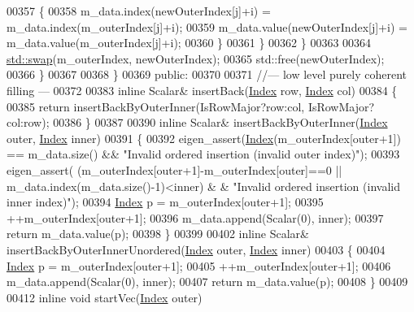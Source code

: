 \begin{DoxyCode}
00357             \{
00358               m\_data.index(newOuterIndex[j]+i) = m\_data.index(m\_outerIndex[j]+i);
00359               m\_data.value(newOuterIndex[j]+i) = m\_data.value(m\_outerIndex[j]+i);
00360             \}
00361           \}
00362         \}
00363         
00364         \hyperlink{endian_8c_a3ca5ecd34b04d6a243c054ac3a57f68d}{std::swap}(m\_outerIndex, newOuterIndex);
00365         std::free(newOuterIndex);
00366       \}
00367       
00368     \}
00369   \textcolor{keyword}{public}:
00370 
00371     \textcolor{comment}{//--- low level purely coherent filling ---}
00372 
00383     \textcolor{keyword}{inline} Scalar& insertBack(\hyperlink{group___core___module_a554f30542cc2316add4b1ea0a492ff02}{Index} row, \hyperlink{group___core___module_a554f30542cc2316add4b1ea0a492ff02}{Index} col)
00384     \{
00385       \textcolor{keywordflow}{return} insertBackByOuterInner(IsRowMajor?row:col, IsRowMajor?col:row);
00386     \}
00387 
00390     \textcolor{keyword}{inline} Scalar& insertBackByOuterInner(\hyperlink{group___core___module_a554f30542cc2316add4b1ea0a492ff02}{Index} outer, \hyperlink{group___core___module_a554f30542cc2316add4b1ea0a492ff02}{Index} inner)
00391     \{
00392       eigen\_assert(\hyperlink{namespace_eigen_a62e77e0933482dafde8fe197d9a2cfde}{Index}(m\_outerIndex[outer+1]) == m\_data.size() && \textcolor{stringliteral}{"Invalid ordered insertion
       (invalid outer index)"});
00393       eigen\_assert( (m\_outerIndex[outer+1]-m\_outerIndex[outer]==0 || m\_data.index(m\_data.size()-1)<inner) &
      & \textcolor{stringliteral}{"Invalid ordered insertion (invalid inner index)"});
00394       \hyperlink{group___core___module_a554f30542cc2316add4b1ea0a492ff02}{Index} p = m\_outerIndex[outer+1];
00395       ++m\_outerIndex[outer+1];
00396       m\_data.append(Scalar(0), inner);
00397       \textcolor{keywordflow}{return} m\_data.value(p);
00398     \}
00399 
00402     \textcolor{keyword}{inline} Scalar& insertBackByOuterInnerUnordered(\hyperlink{group___core___module_a554f30542cc2316add4b1ea0a492ff02}{Index} outer, \hyperlink{group___core___module_a554f30542cc2316add4b1ea0a492ff02}{Index} inner)
00403     \{
00404       \hyperlink{group___core___module_a554f30542cc2316add4b1ea0a492ff02}{Index} p = m\_outerIndex[outer+1];
00405       ++m\_outerIndex[outer+1];
00406       m\_data.append(Scalar(0), inner);
00407       \textcolor{keywordflow}{return} m\_data.value(p);
00408     \}
00409 
00412     \textcolor{keyword}{inline} \textcolor{keywordtype}{void} startVec(\hyperlink{group___core___module_a554f30542cc2316add4b1ea0a492ff02}{Index} outer)

\end{DoxyCode}
